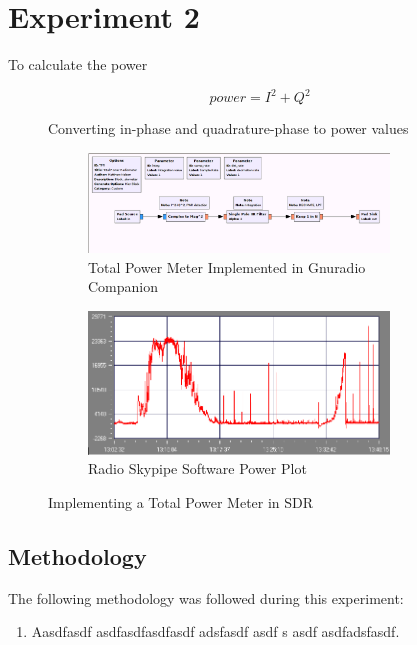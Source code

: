 \documentclass[runningheads,a4paper]{llncs}
\begin{document}
\newpage
\section*{Experiment 2}

To calculate the power 

%
\begin{figure}[here]
	\centering
	\begin{equation}
	power = I^2 + Q^2
	\end{equation}
	\caption{Converting in-phase and quadrature-phase to power values}
	\label{fig:power_formula}
\end{figure}
%

%
\begin{figure}	
	\centering
	\begin{subfigure}[t]{8cm}
		\centering
		\includegraphics[width=8cm]{images/17}
		\caption{Total Power Meter Implemented in Gnuradio Companion \citep{nelson-15}}
		\label{fig:sdr_square_law_detector} 
	\end{subfigure}
	\quad
	\begin{subfigure}[t]{8cm}
		\centering
		\includegraphics[width=8cm]{images/18}
		\caption{Radio Skypipe Software Power Plot \citep{rsp-15}}
		\label{fig:radio_skypipe_power_plot}
	\end{subfigure}
	\caption{Implementing a Total Power Meter in \gls{SDR}}\label{fig:sdr_power_plots}
\end{figure}
%

\subsection*{Methodology}
The following methodology was followed during this experiment:

\begin{enumerate}
	\item Aasdfasdf asdfasdfasdfasdf adsfasdf asdf s asdf  asdfadsfasdf. 
\end{enumerate}
\end{document}
